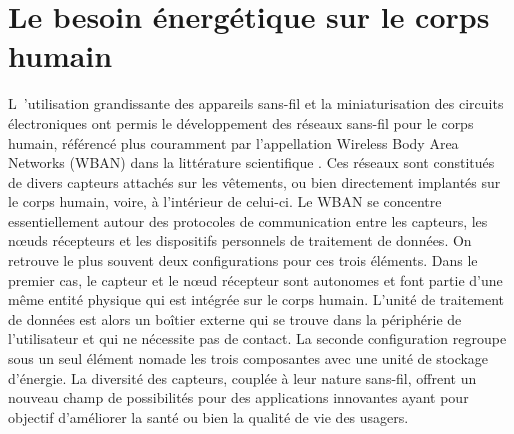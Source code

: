 \section{Le besoin énergétique sur le corps humain}
\label{sec:1.1_Contexte de la these et pertinence de la recuperation d energie}
\lettrine[lines=1]{L~’}{}utilisation grandissante des appareils sans-fil et la miniaturisation des circuits électroniques ont permis le développement des réseaux sans-fil pour le corps humain, référencé plus couramment par l’appellation Wireless Body Area Networks (WBAN) dans la littérature scientifique \cite{Latre2011}. Ces réseaux sont constitués de divers capteurs attachés sur les vêtements, ou bien directement implantés sur le corps humain, voire, à l'intérieur de celui-ci. Le WBAN se concentre essentiellement autour des protocoles de communication entre les capteurs, les n\oe{}uds récepteurs et les dispositifs personnels de traitement de données. On retrouve le plus souvent deux configurations pour ces trois éléments. Dans le premier cas, le capteur et le n\oe{}ud récepteur sont autonomes et font partie d'une même entité physique qui est intégrée sur le corps humain. L'unité de traitement de données est alors un boîtier externe qui se trouve dans la périphérie de l'utilisateur et qui ne nécessite pas de contact. La seconde configuration regroupe sous un seul élément nomade les trois composantes avec une unité de stockage d'énergie. La diversité des capteurs, couplée à leur nature sans-fil, offrent un nouveau champ de possibilités pour des applications innovantes ayant pour objectif d'améliorer la santé ou bien la qualité de vie des usagers.\\

